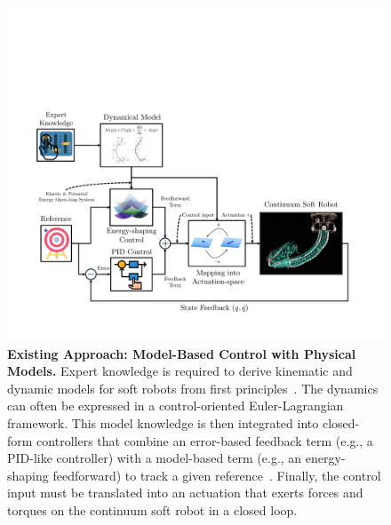 \begin{figure}[ht]
    \centering
    \includegraphics[width=1.0\linewidth]{introduction/figures/model_based_control_with_physical_models_v1_cropped.pdf}
    \caption{\textbf{Existing Approach: Model-Based Control with Physical Models.}
    Expert knowledge is required to derive kinematic and dynamic models for soft robots from first principles~\citep{armanini2017elastica}. The dynamics can often be expressed in a control-oriented Euler-Lagrangian framework. This model knowledge is then integrated into closed-form controllers that combine an error-based feedback term (e.g., a PID-like controller) with a model-based term (e.g., an energy-shaping feedforward) to track a given reference~\citep{della2020model, caasenbrood2021energy, della2023model}. Finally, the control input must be translated into an actuation that exerts forces and torques on the continuum soft robot in a closed loop.
    }
    \label{fig:introduction:model_based_control_with_physical_models}
\end{figure}


